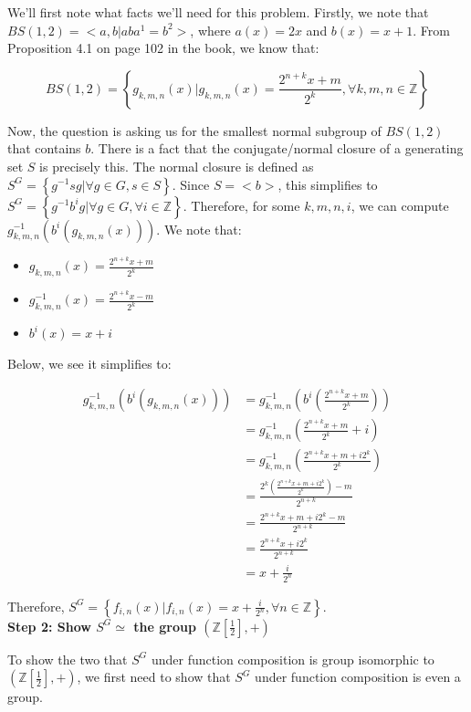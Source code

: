 \documentclass[12pt]{article}%
\newcommand{\Z}{\mathbb{Z}}
\begin{document}
We'll first note what facts we'll need for this problem. Firstly, we note that $BS(1,2)=<a,b|aba^1=b^2>$,
where $a(x)=2x$ and $b(x)=x+1$.  From Proposition 4.1 on page 102 in the book, we know that:

\begin{equation}
BS(1,2)=\left\{g_{k,m,n}(x) | g_{k,m,n}(x)=\frac{2^{n+k}x+m}{2^k}, \forall k, m, n \in \Z \right\}
\end{equation}

Now, the question is asking us for the smallest normal subgroup of $BS(1,2)$ that contains $b$. There is a
fact that the conjugate/normal closure of a generating set $S$ is precisely this. The normal closure is
defined as $S^G=\left\{g^{-1}sg|\forall g\in G, s\in S\right\}$. Since $S=<b>$, this simplifies to
$S^G=\left\{g^{-1}b^{i}g|\forall g\in G, \forall i \in \Z \right\}$. Therefore, for some $k, m, n, i$, we
can compute $g_{k,m,n}^{-1}(b^{i}(g_{k,m,n}(x)))$. We note that:

\begin{itemize}
\item $g_{k,m,n}(x)=\frac{2^{n+k}x+m}{2^k}$ 
\item $g_{k,m,n}^{-1}(x)=\frac{2^{n+k}x-m}{2^k}$ 
\item $b^{i}(x)=x+i$ 
\end{itemize}

Below, we see it simplifies to:

\begin{align*}
g_{k,m,n}^{-1}(b^{i}(g_{k,m,n}(x)))
&= g_{k,m,n}^{-1}\left(b^{i}\left(\frac{2^{n+k}x+m}{2^k}\right)\right) \\
&= g_{k,m,n}^{-1}\left(\frac{2^{n+k}x+m}{2^k}+i\right) \\
&= g_{k,m,n}^{-1}\left(\frac{2^{n+k}x+m+i2^k}{2^k}\right) \\
&= \frac{2^k\left(\frac{2^{n+k}x+m+i2^k}{2^k}\right)-m}{2^{n+k}} \\
&= \frac{2^{n+k}x+m+i2^k-m}{2^{n+k}} \\
&= \frac{2^{n+k}x+i2^k}{2^{n+k}} \\
&= x+\frac{i}{2^{n}}
\end{align*}

Therefore, $S^G=\left\{f_{i,n}(x)|f_{i,n}(x)=x+\frac{i}{2^{n}}, \forall n\in \Z\right\}$.\\

\textbf{Step 2: Show $S^G\simeq$  the group $\left(\Z\left[\frac{1}{2}\right],+\right)$}

To show the two that $S^G$ under function composition is group isomorphic to
$\left(\Z\left[\frac{1}{2}\right],+\right)$, we first need to show that $S^G$ under function composition
is even a group. \\
\end{document}
